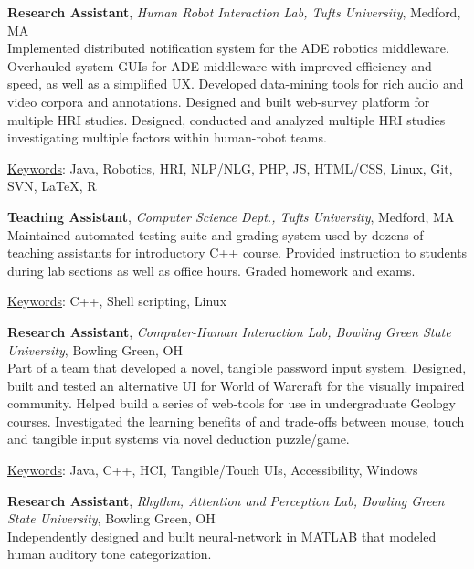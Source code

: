 \documentclass[10pt, letter]{article}
\newcommand{\years}[1]{\marginnote{\footnotesize #1}}
\newenvironment{desc*}{
  \begin{description}
    \setlength{\itemsep}{0.2pt}
    \setlength{\parskip}{-1pt}
    \setlength{\parsep}{0pt}
  }{
  \end{description}
}
\begin{document}
\years{2012 - 2014} 
\textbf{Research Assistant}, 
\textsl{Human Robot Interaction Lab, Tufts University}, Medford, MA\\ 
Implemented distributed notification system for the ADE robotics
middleware. Overhauled system GUIs for ADE middleware with improved
efficiency and speed, as well as a simplified UX. Developed
data-mining tools for rich audio and video corpora and annotations.
Designed and built web-survey platform for multiple HRI studies.
Designed, conducted and analyzed multiple HRI studies investigating
multiple factors within human-robot teams.
\vspace{-.5cm}
\begin{desc*}
\item[\rm \underline{Keywords}:] Java, Robotics, HRI, NLP/NLG, PHP, JS, HTML/CSS, Linux, Git,
  SVN, \LaTeX, R
\end{desc*}

\years{2012, 2013} 
\textbf{Teaching Assistant}, 
\textsl{Computer Science Dept., Tufts University}, Medford, MA \\ Maintained
automated testing suite and grading system used by dozens of teaching
assistants for introductory C++ course. Provided instruction to
students during lab sections as well as office hours. Graded homework
and exams.
\vspace{-.1cm}
\begin{desc*}
\item[\rm \underline{Keywords}:] C++, Shell scripting, Linux
\end{desc*}

\years{2010 - 2012}
\textbf{Research Assistant}, \textsl{Computer-Human
  Interaction Lab, Bowling Green State University}, Bowling Green, OH \\
Part of a team that developed a novel, tangible password input system.
Designed, built and tested an alternative UI for World of Warcraft for
the visually impaired community. Helped build a series of web-tools
for use in undergraduate Geology courses. Investigated the learning
benefits of and trade-offs between mouse, touch and tangible input
systems via novel deduction puzzle/game.
\vspace{-.1cm}
\begin{desc*}
\item[\rm \underline{Keywords}:] Java, C++, HCI, Tangible/Touch UIs, Accessibility, Windows
\end{desc*}

\years{2008 - 2010} 
\textbf{Research Assistant},
\textsl{Rhythm, Attention and Perception Lab, Bowling Green State
  University}, Bowling Green, OH\\ 
Independently designed and built neural-network in MATLAB that
modeled human auditory tone categorization.\\
\end{document}
